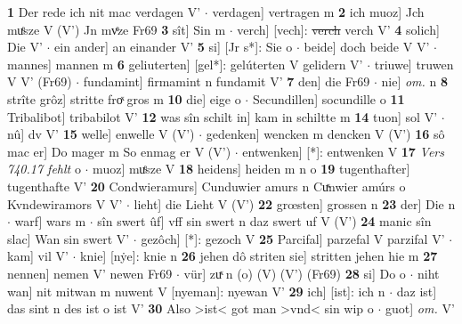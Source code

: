\documentclass[8pt,a4paper,notitlepage]{article}
\begin{document}
\begin{table}[ht]
\begin{minipage}[t]{0.5\linewidth}
\textbf{1} Der rede ich nit mac verdagen V'  $\cdot$ verdagen] vertragen m \textbf{2} ich muoz] Jch muͤsze V (V') Jn mvͤze Fr69 \textbf{3} sît] Sin m  $\cdot$ verch] [vech]: \sout{verch} verch V' \textbf{4} solich] Die V'  $\cdot$ ein ander] an einander V' \textbf{5} si] [Jr s*]: Sie o  $\cdot$ beide] doch beide V V'  $\cdot$ mannes] mannen m \textbf{6} geliuterten] [gel*]: gelúterten V gelidern V'  $\cdot$ triuwe] truwen V V' (Fr69)  $\cdot$ fundamint] firmamint n fundamit V' \textbf{7} den] die Fr69  $\cdot$ nie] \textit{om.} n \textbf{8} strîte grôz] stritte froͯ gros m \textbf{10} die] eige o  $\cdot$ Secundillen] socundille o \textbf{11} Tribalibot] tribabilot V' \textbf{12} was sîn schilt in] kam in schiltte m \textbf{14} tuon] sol V'  $\cdot$ nû] dv V' \textbf{15} welle] enwelle V (V')  $\cdot$ gedenken] wencken m dencken V (V') \textbf{16} sô mac er] Do mager m So enmag er V (V')  $\cdot$ entwenken] [*]: entwenken V \textbf{17} \textit{Vers 740.17 fehlt} o   $\cdot$ muoz] muͤsze V \textbf{18} heidens] heiden m n o \textbf{19} tugenthafter] tugenthafte V' \textbf{20} Condwieramurs] Cunduwier amurs n Cuͯnwier amúrs o Kvndewiramors V V'  $\cdot$ lieht] die Lieht V (V') \textbf{22} grœsten] grossen n \textbf{23} der] Die n  $\cdot$ warf] wars m  $\cdot$ sîn swert ûf] vff sin swert n daz swert uf V (V') \textbf{24} manic sîn slac] Wan sin swert V'  $\cdot$ gezôch] [*]: gezoch V \textbf{25} Parcifal] parzefal V parzifal V'  $\cdot$ kam] vil V'  $\cdot$ knie] [nẏe]: knie n \textbf{26} jehen dô striten sie] stritten jehen hie m \textbf{27} nennen] nemen V' newen Fr69  $\cdot$ vür] zuͯ n (o) (V) (V') (Fr69) \textbf{28} si] Do o  $\cdot$ niht wan] nit mitwan m nuwent V [nyeman]: nyewan V' \textbf{29} ich] [ist]: ich n  $\cdot$ daz ist] das sint n des ist o ist V' \textbf{30} Also >ist< got man >vnd< sin wip o  $\cdot$ guot] \textit{om.} V' \newline
\end{minipage}
\end{table}
\newpage
\end{document}
